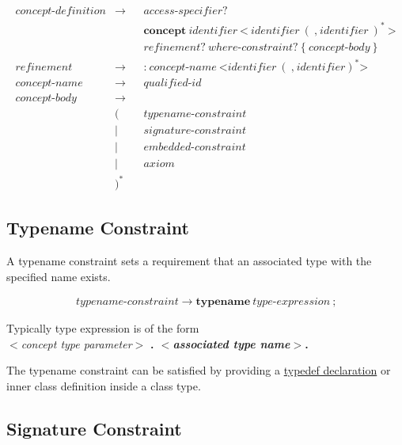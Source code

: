\documentclass[a4paper,oneside,11pt]{article}
\begin{document}
\begin{align*}
concept\textrm{-}definition &\rightarrow & &\hyperref[accessspecifier]{access\textrm{-}specifier}?\\
& & &\textbf{concept} \> \hyperref[identifier]{identifier} \> \texttt{<} \> \hyperref[identifier]{identifier} \> (\> \texttt{,} \>
\hyperref[identifier]{identifier} \>)^* \> \texttt{>}\\
& & &refinement? \> \hyperref[whereconstraint]{where\textrm{-}constraint}? \> \texttt{\{} \> concept\textrm{-}body \> \texttt{\}}\\
refinement &\rightarrow & &\texttt{:} \> concept\textrm{-}name \> \texttt{<} \hyperref[identifier]{identifier} \>
(\> \texttt{,} \> \hyperref[identifier]{identifier})^* \texttt{>}\\
concept\textrm{-}name &\rightarrow & &\hyperref[qualifiedid]{qualified\textrm{-}id}\\
concept\textrm{-}body &\rightarrow\\
&( & &\hyperref[typenameconstraint]{typename\textrm{-}constraint}\\
&| & &\hyperref[signatureconstraint]{signature\textrm{-}constraint}\\
&| & &\hyperref[embeddedconstraint]{embedded\textrm{-}constraint}\\
&| & &\hyperref[axiom]{axiom}\\
&)^*
\end{align*}

\subsection{Typename Constraint}\label{typenameconstraint}

A typename constraint sets a requirement that an associated type with the specified name exists.

\begin{align*}
typename\textrm{-}constraint \rightarrow \textbf{typename} \> \hyperref[typeexpr]{type\textrm{-}expression} \> \texttt{;}
\end{align*}

Typically type expression is of the form\\
\emph{$<$concept type parameter$>$} \bf{.} \emph{$<$associated type name$>$}.

The typename constraint can be satisfied by providing a \hyperref[typedefdeclaration]{typedef declaration} or inner class definition inside a
class type.

\subsection{Signature Constraint}\label{signatureconstraint}
\end{document}
